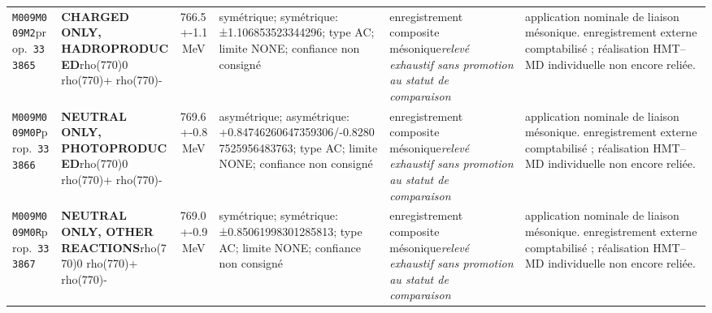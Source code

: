 \begin{landscape}
\begin{longtable}{L{1.85cm}L{4.45cm}L{2.35cm}L{4.05cm}L{3.35cm}L{7.15cm}}
\texttt{M009}\newline \texttt{M009M2}\newline prop.\ \texttt{333865} & \textbf{CHARGED ONLY, HADROPRODUCED}\newline rho(770)0 \textbar{}\allowbreak{} rho(770)+ \textbar{}\allowbreak{} rho(770)- & 766.5+-1.1\,MeV & symétrique; symétrique: ±1.106853523344296; type AC; limite NONE; confiance non consigné & enregistrement composite mésonique\newline \emph{relevé exhaustif sans promotion au statut de comparaison} & application nominale de liaison mésonique. enregistrement externe comptabilisé ; réalisation HMT--MD individuelle non encore reliée. \\
\texttt{M009}\newline \texttt{M009M0P}\newline prop.\ \texttt{333866} & \textbf{NEUTRAL ONLY, PHOTOPRODUCED}\newline rho(770)0 \textbar{}\allowbreak{} rho(770)+ \textbar{}\allowbreak{} rho(770)- & 769.6+-0.8\,MeV & asymétrique; asymétrique: +0.84746260647359306/-0.82807525956483763; type AC; limite NONE; confiance non consigné & enregistrement composite mésonique\newline \emph{relevé exhaustif sans promotion au statut de comparaison} & application nominale de liaison mésonique. enregistrement externe comptabilisé ; réalisation HMT--MD individuelle non encore reliée. \\
\texttt{M009}\newline \texttt{M009M0R}\newline prop.\ \texttt{333867} & \textbf{NEUTRAL ONLY, OTHER REACTIONS}\newline rho(770)0 \textbar{}\allowbreak{} rho(770)+ \textbar{}\allowbreak{} rho(770)- & 769.0+-0.9\,MeV & symétrique; symétrique: ±0.85061998301285813; type AC; limite NONE; confiance non consigné & enregistrement composite mésonique\newline \emph{relevé exhaustif sans promotion au statut de comparaison} & application nominale de liaison mésonique. enregistrement externe comptabilisé ; réalisation HMT--MD individuelle non encore reliée. \\

\end{longtable}
\end{landscape}

